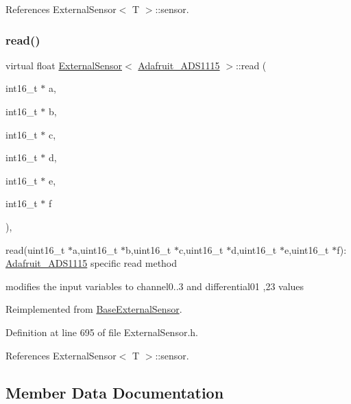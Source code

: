 References External\+Sensor$<$ T $>$\+::sensor.

\mbox{\label{class_external_sensor_3_01_adafruit___a_d_s1115_01_4_aa9ce4b3899967e9decdba76decf292af}} 
\subsubsection{\texorpdfstring{read()}{read()}}
{\footnotesize\ttfamily virtual float \hyperlink{class_external_sensor}{External\+Sensor}$<$ \hyperlink{class_adafruit___a_d_s1115}{Adafruit\+\_\+\+A\+D\+S1115} $>$\+::read (\begin{DoxyParamCaption}\item[{int16\+\_\+t $\ast$}]{a,  }\item[{int16\+\_\+t $\ast$}]{b,  }\item[{int16\+\_\+t $\ast$}]{c,  }\item[{int16\+\_\+t $\ast$}]{d,  }\item[{int16\+\_\+t $\ast$}]{e,  }\item[{int16\+\_\+t $\ast$}]{f }\end{DoxyParamCaption})\hspace{0.3cm}{\ttfamily [inline]}, {\ttfamily [virtual]}}

read(uint16\+\_\+t $\ast$a,uint16\+\_\+t $\ast$b,uint16\+\_\+t $\ast$c,uint16\+\_\+t $\ast$d,uint16\+\_\+t $\ast$e,uint16\+\_\+t $\ast$f)\+: \hyperlink{class_adafruit___a_d_s1115}{Adafruit\+\_\+\+A\+D\+S1115} specific read method

modifies the input variables to channel0..3 and differential01 ,23 values 

Reimplemented from \hyperlink{class_base_external_sensor_a1867ba10561be26f2f5ec29421e6fb21}{Base\+External\+Sensor}.



Definition at line 695 of file External\+Sensor.\+h.



References External\+Sensor$<$ T $>$\+::sensor.



\subsection{Member Data Documentation}
\mbox{\label{class_external_sensor_3_01_adafruit___a_d_s1115_01_4_a0e1585ff946f9ce0e259d515baa4ad54}} 
